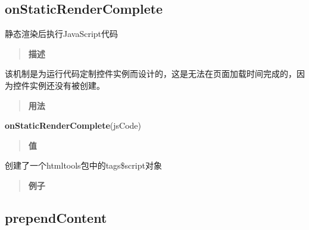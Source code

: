 \documentclass[]{book}
\newenvironment{Shaded}{\begin{snugshade}}{\end{snugshade}}
\newcommand{\KeywordTok}[1]{\textcolor[rgb]{0.13,0.29,0.53}{\textbf{#1}}}
\newcommand{\DataTypeTok}[1]{\textcolor[rgb]{0.13,0.29,0.53}{#1}}
\newcommand{\StringTok}[1]{\textcolor[rgb]{0.31,0.60,0.02}{#1}}
\newcommand{\OtherTok}[1]{\textcolor[rgb]{0.56,0.35,0.01}{#1}}
\newcommand{\OperatorTok}[1]{\textcolor[rgb]{0.81,0.36,0.00}{\textbf{#1}}}
\newcommand{\NormalTok}[1]{#1}
\theoremstyle{definition}
\theoremstyle{definition}
\theoremstyle{definition}
\theoremstyle{remark}
\begin{document}
\subsection{onStaticRenderComplete}\label{onstaticrendercomplete}

静态渲染后执行JavaScript代码

\begin{quote}
\textbf{描述}
\end{quote}

该机制是为运行代码定制控件实例而设计的，这是无法在页面加载时间完成的，因为控件实例还没有被创建。

\begin{quote}
\textbf{用法}
\end{quote}

\begin{Shaded}
\begin{Highlighting}[]
\KeywordTok{onStaticRenderComplete}\NormalTok{(jsCode)}
\end{Highlighting}
\end{Shaded}

\begin{quote}
\textbf{值}
\end{quote}

创建了一个htmltools包中的tags\$script对象

\begin{quote}
\textbf{例子}
\end{quote}

\begin{Shaded}
\end{Shaded}

\subsection{prependContent}\label{prependcontent}
\end{document}
